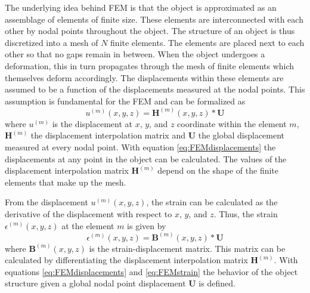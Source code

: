 \documentclass[11pt,a4paper]{report}
\begin{document}
The underlying idea behind FEM is that the object is approximated as an
assemblage of elements of finite size. These elements are interconnected with
each other by nodal points throughout the object. The structure of an object is
thus discretized into a mesh of $N$ finite elements. The elements are placed
next to each other so that no gaps remain in between. When the object undergoes a
deformation, this in turn propagates through the mesh of finite elements which
themselves deform accordingly. The displacements within these elements are assumed to be a function
of the displacements measured at the nodal points. This assumption is
fundamental for the FEM and can be formalized as
\begin{equation}\label{eq:FEMdisplacements}
u^{(m)}(x,y,z) = \mathbf{H}^{(m)}(x,y,z)*\mathbf{U}
\end{equation}
where $u^{(m)}$ is the displacement at $x$, $y$, and $z$ coordinate within the element $m$, $\mathbf{H}^{(m)}$
the displacement interpolation matrix and $\mathbf{U}$ the global
displacement measured at every nodal point. With equation
\ref{eq:FEMdisplacements} the displacements at any point in the object can be calculated.
The values of the displacement interpolation matrix $\mathbf{H}^{(m)}$ depend on
the shape of the finite elements that make up the mesh.

From the displacement $u^{(m)}(x,y,z)$, the strain can be calculated as the
derivative of the displacement with respect to $x$, $y$, and $z$. Thus, the
strain $\epsilon^{(m)}(x,y,z)$ at the element $m$ is given by  
\begin{equation}\label{eq:FEMstrain}
\epsilon^{(m)}(x,y,z) = \mathbf{B}^{(m)}(x,y,z)*\mathbf{U}
\end{equation}
where $\mathbf{B}^{(m)}(x,y,z)$ is the strain-displacement matrix. This matrix can
be calculated by differentiating the displacement interpolation matrix
$\mathbf{H}^{(m)}$. With equations \ref{eq:FEMdisplacements} and \ref{eq:FEMstrain} the behavior of
the object structure given a global nodal point displacement $\mathbf{U}$ is
defined. 
\end{document}
